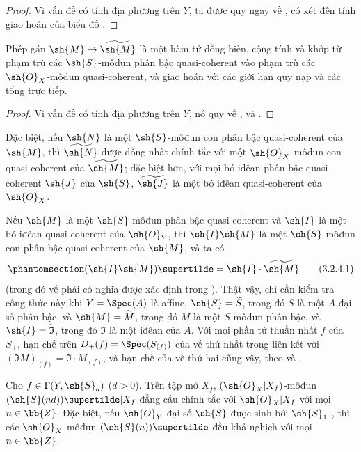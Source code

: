 \documentclass[oneside,10pt]{amsart}
\makeatletter
\newcommand{\ega@arrow}[2]{\mathchoice{#1}{#2}{#2}{#2}}
\let\ega@shortmapsto\mapsto
\renewcommand{\mapsto}{\ega@arrow{\longmapsto}{\ega@shortmapsto}}
\newcommand{\oldpage}[2][]{\marginnote{\normalfont\footnotesize\textbf{#1}~|~#2}\ignorespaces}
\let\EGAOriginalLabel\label
\renewcommand{\label}[1]{\phantomsection\EGAOriginalLabel{#1}}
\makeatother
\begin{document}
\begin{proof}
Vì vấn đề có tính địa phương trên $Y$, ta được quy ngay về , có xét đến tính giao hoán của biểu đồ .
\end{proof}

\begin{proposition}[3.2.4]
\label{II.3.2.4}
Phép gán $\sh{M}\mapsto\widetilde{\sh{M}}$ là một hàm tử đồng biến, cộng tính và khớp từ phạm trù các $\sh{S}$-môđun phân bậc quasi-coherent vào phạm trù các $\sh{O}_X$-môđun quasi-coherent, và giao hoán với các giới hạn quy nạp và các tổng trực tiếp.
\end{proposition}

\begin{proof}
Vì vấn đề có tính địa phương trên $Y$, nó quy về ,  và .
\end{proof}

Đặc biệt, nếu $\sh{N}$ là một $\sh{S}$-môđun con phân bậc quasi-coherent của $\sh{M}$, thì $\widetilde{\sh{N}}$ được đồng nhất chính tắc với một $\sh{O}_X$-môđun con quasi-coherent của $\widetilde{\sh{M}}$;
đặc biệt hơn, với mọi bó iđêan phân bậc quasi-coherent $\sh{J}$ của $\sh{S}$, $\widetilde{\sh{J}}$ là một bó iđêan quasi-coherent của $\sh{O}_X$.

Nếu $\sh{M}$ là một $\sh{S}$-môđun phân bậc quasi-coherent và $\sh{I}$ là một bó iđêan quasi-coherent của $\sh{O}_Y$, thì $\sh{I}\sh{M}$ là một $\sh{S}$-môđun con phân bậc quasi-coherent của $\sh{M}$, và ta có
\[
\label{II.3.2.4.1}
  (\sh{I}\sh{M})\supertilde=\sh{I}\cdot\widetilde{\sh{M}}
\tag{3.2.4.1}
\]
(trong đó vế phải có nghĩa được xác định trong ).
Thật vậy, chỉ cần kiểm tra công thức này khi $Y=\Spec(A)$ là affine, $\sh{S}=\widetilde{S}$, trong đó $S$ là một $A$-đại số phân bậc, và $\sh{M}=\widetilde{M}$,
\oldpage[II]{55}
trong đó $M$ là một $S$-môđun phân bậc, và $\sh{I}=\widetilde{\mathfrak{I}}$, trong đó $\mathfrak{I}$ là một iđêan của $A$.
Với mọi phần tử thuần nhất $f$ của $S_+$, hạn chế trên $D_+(f)=\Spec(S_{(f)})$ của vế thứ nhất trong  liên kết với $(\mathfrak{I}M)_{(f)}=\mathfrak{I}\cdot M_{(f)}$, và hạn chế của vế thứ hai cũng vậy, theo  và .

\begin{proposition}[3.2.5]
\label{II.3.2.5}
Cho $f\in\Gamma(Y,\sh{S}_d)$ ($d>0$).
Trên tập mở $X_f$, $(\sh{O}_X|X_f)$-môđun $(\sh{S}(nd))\supertilde|X_f$ đẳng cấu chính tắc với $\sh{O}_X|X_f$ với mọi $n\in\bb{Z}$.
Đặc biệt, nếu $\sh{O}_Y$-đại số $\sh{S}$ được sinh bởi $\sh{S}_1$ , thì các $\sh{O}_X$-môđun $(\sh{S}(n))\supertilde$ đều khả nghịch với mọi $n\in\bb{Z}$.
\end{proposition}
\end{document}

